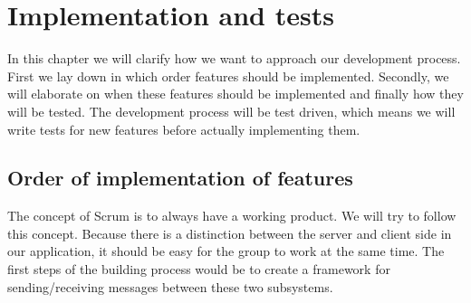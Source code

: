 \documentclass[a4paper]{article}
\begin{document}
\section{Implementation and tests}

In this chapter we will clarify how we want to approach our development process. First we lay down in which order features should be implemented. Secondly, we will elaborate on when these features should be implemented and finally how they will be tested. The development process will be test driven, which means we will write tests for new features before actually implementing them.

\subsection{Order of implementation of features}
The concept of Scrum is to always have a working product. We will try to follow this concept. Because there is a distinction between the server and client side in our application, it should be easy for the group to work at the same time. The first steps of the building process would be to create a framework for sending/receiving messages between these two subsystems. \\
\end{document}
